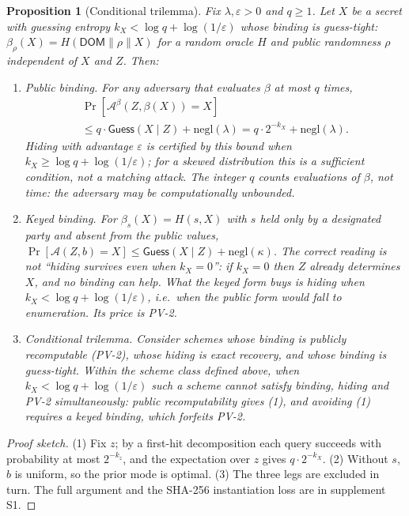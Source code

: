 \documentclass[10pt,journal,compsoc]{IEEEtran}
\newtheorem{proposition}[theorem]{Proposition}
\begin{document}
\begin{proposition}[Conditional trilemma]
\label{thm:t1}
\label{thm:trilemma}
Fix $\lambda,\varepsilon>0$ and $q\ge 1$. Let $X$ be a secret with guessing
entropy $k_X<\log q+\log(1/\varepsilon)$ whose binding is \emph{guess-tight}:
$\beta_\rho(X)=H(\mathsf{DOM}\|\rho\|X)$ for a random oracle $H$ and public
randomness $\rho$ independent of $X$ and $Z$. Then:
\begin{enumerate}
\item[(1)] \emph{Public binding.} For any adversary that evaluates $\beta$ at
most $q$ times,
\begin{multline*}
\Pr\!\left[\mathcal{A}^\beta(Z,\beta(X))=X\right]\\
\le q\cdot\mathsf{Guess}(X\mid Z)+\mathrm{negl}(\lambda)
= q\cdot 2^{-k_X}+\mathrm{negl}(\lambda).
\end{multline*}
Hiding with advantage $\varepsilon$ is \emph{certified} by this bound when
$k_X\ge\log q+\log(1/\varepsilon)$; for a skewed distribution this is a
sufficient condition, not a matching attack. The integer $q$ counts evaluations
of $\beta$, not time: the adversary may be computationally unbounded.
\item[(2)] \emph{Keyed binding.} For $\beta_s(X)=H(s,X)$ with $s$ held only by a
designated party and absent from the public values,
$\Pr[\mathcal{A}(Z,b)=X]\le\mathsf{Guess}(X\mid Z)+\mathrm{negl}(\kappa)$.
The correct reading is \emph{not} ``hiding survives even when $k_X=0$'': if
$k_X=0$ then $Z$ already determines $X$, and no binding can help. What the keyed
form buys is hiding when $k_X<\log q+\log(1/\varepsilon)$, i.e.\ when the public
form would fall to enumeration. Its price is PV-2.
\item[(3)] \emph{Conditional trilemma.} Consider schemes whose binding is
publicly recomputable (PV-2), whose hiding is exact recovery, and whose binding
is guess-tight. Within the scheme class defined above, when
$k_X<\log q+\log(1/\varepsilon)$ such a scheme cannot satisfy binding, hiding
and PV-2 simultaneously: public recomputability gives (1), and avoiding (1)
requires a keyed binding, which forfeits PV-2.
\end{enumerate}
\end{proposition}

\begin{proof}[Proof sketch]
(1) Fix $z$; by a first-hit decomposition each query succeeds with probability
at most $2^{-k_z}$, and the expectation over $z$ gives $q\cdot2^{-k_X}$. (2)
Without $s$, $b$ is uniform, so the prior mode is optimal. (3) The three legs
are excluded in turn. The full argument and the SHA-256 instantiation loss are
in supplement S1.
\end{proof}
\end{document}

